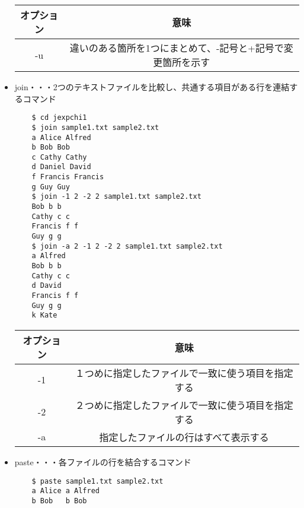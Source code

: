 \documentclass[a4paper,12pt]{jarticle}
\begin{document}
\begin{itemize}
          \begin{table}[h]
              \begin{center}
                  \begin{tabular}{|c|c|} \hline
                      オプション & 意味                                                        \\ \hline
                      -u         & 違いのある箇所を1つにまとめて、-記号と+記号で変更箇所を示す \\ \hline
                  \end{tabular}
              \end{center}
          \end{table}
    \item join・・・2つのテキストファイルを比較し、共通する項目がある行を連結するコマンド
          \begin{lstlisting}
    $ cd jexpchi1
    $ join sample1.txt sample2.txt
    a Alice Alfred
    b Bob Bob
    c Cathy Cathy
    d Daniel David
    f Francis Francis
    g Guy Guy
    $ join -1 2 -2 2 sample1.txt sample2.txt
    Bob b b
    Cathy c c
    Francis f f
    Guy g g
    $ join -a 2 -1 2 -2 2 sample1.txt sample2.txt
    a Alfred
    Bob b b
    Cathy c c
    d David
    Francis f f
    Guy g g
    k Kate
           \end{lstlisting}
          \clearpage
          \begin{table}[h]
              \begin{center}
                  \begin{tabular}{|c|c|} \hline
                      オプション & 意味                                               \\ \hline
                      -1         & １つめに指定したファイルで一致に使う項目を指定する \\ \hline
                      -2         & ２つめに指定したファイルで一致に使う項目を指定する \\ \hline
                      -a         & 指定したファイルの行はすべて表示する               \\ \hline
                  \end{tabular}
              \end{center}
          \end{table}
    \item paste・・・各ファイルの行を結合するコマンド
          \begin{lstlisting}
    $ paste sample1.txt sample2.txt
    a Alice	a Alfred
    b Bob	b Bob

\end{lstlisting}
\end{itemize}
\end{document}
